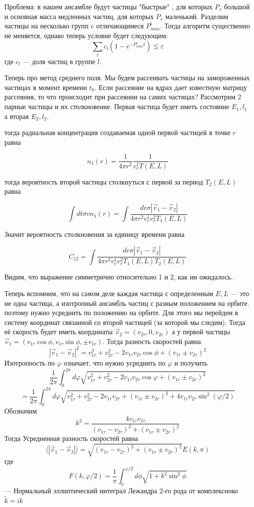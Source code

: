 Проблема: в нашем ансамбле будут частицы "быстрые" , для которых $P_{s}$ большой и основная масса медленных частиц, для которых $P_{s}$ маленький. 
Разделим частицы на несколько групп c отличающимеся 
$P_{max}^{l}$. Тогда алгоритм существенно не меняется, однако теперь условие будет следующим:
\[
	\sum_l{ c_l (1 - e^{-P_{max}^{l} t}) } \lesssim \varepsilon
\]
где $c_l$ --- доля частиц в группе $l$.

Теперь про метод среднего поля. Мы будем рассеивать частицы на замороженных частицах в момент времени $t_0$.
Если рассеяние на ядрах дает известную матрицу рассеяния, то что происходит при рассеянии на самих частицах? 
Рассмотрим 2 парные частицы и их столкновение. Первая частица будет иметь состояние $E_1, l_1$ а вторая $E_2, l_2$. 

тогда радиальная концентрация создаваемая одной первой частицей в точке $r$ равна

\[
	n_1(r) = \frac{1}{4\pi r^2} \frac{1}{v^1_r T(E,L)}
\]

тогда вероятность второй частицы столкнуться с первой за период $T_2(E,L)$ равна

\[
	\int{dt \sigma v n_1(r) } = 
	\int{\frac{dr \sigma |\vec{v}_1 - \vec{v}_2|}
	{4\pi r^2 v^1_r v^2_r T_1(E,L)}}
\]

Значит вероятность столкновения за единицу времени равна

\[
	C_{12} = \int{\frac{dr \sigma |\vec{v}_1 - \vec{v}_2|}
	{4\pi r^2 v^1_r v^2_r T_1(E,L) T_2(E,L)}}
\]

Видим, что выражение симметрично относительно 1 и 2, как ии ожидалось.

Теперь вспомним, что на самом деле каждая частица с определенным $E,L$ --- это не одна частица, а изотропный ансамбль частиц с разным положением на орбите. поэтому нужно усреднить по положению на орбите.
Для этого мы перейдем в систему координат связанной со второй частицей (за которой мы следим). Тогда её скорость будет иметь координаты $\vec{v}_2 = (v_{2 \tau},0,v_{2r})$ а у первой частицы $\vec{v}_1 = (v_{1 \tau} \cos{\phi}, v_{1 \tau} \sin{\phi}, \pm v_{1r})$. Тогда разность скоростей равна
\[
	|\vec{v}_1 - \vec{v}_2|^2 = v_{1 \tau}^2 + v_{2 \tau}^2 - 2 v_{1 \tau} v_{2 \tau} \cos{\phi} + (v_{1r} \pm v_{2r})^2
\]
Изотропность по $\varphi$ означает, что нужно усреднить по $\varphi$ и получить
\[
	\frac{1}{2\pi}\int_0^{2\pi} d\varphi \sqrt{v_{1 \tau}^2 + v_{2 \tau}^2 - 2 v_{1 \tau} v_{2 \tau} \cos{\varphi} + (v_{1r} \pm v_{2r})^2}
\]
\[
	 = \frac{1}{2\pi}\int_0^{2\pi} d\varphi \sqrt{v_{1 \tau}^2 + v_{2 \tau}^2 - 2 v_{1 \tau} v_{2 \tau} + (v_{1r} \pm v_{2r})^2 + 4 v_{1 \tau} v_{2 \tau} \sin^2{(\varphi/2)}}
\]
Обозначим 
\[
	k^2 = \frac{4 v_{1 \tau} v_{2 \tau}}{(v_{1 \tau} - v_{2 \tau})^2 + (v_{1r} \pm v_{2r})^2}
\]
Тогда Усредненная разность скоростей равна
\[
	\langle |\vec{v}_1 - \vec{v}_2| \rangle = \sqrt{(v_{1 \tau} - v_{2 \tau})^2 + (v_{1r} \pm v_{2r})^2} E(k,\pi)
\]
где 
\[
	F(k,\varphi/2) = \frac{1}{\pi} \int_0^{\varphi/2} d\phi \sqrt{1 + k^2 \sin^2{\phi}}  
\]
--- Нормальный эллиптический интеграл Лежандра 2-го рода от комплексноко $\tilde{k} = ik$

